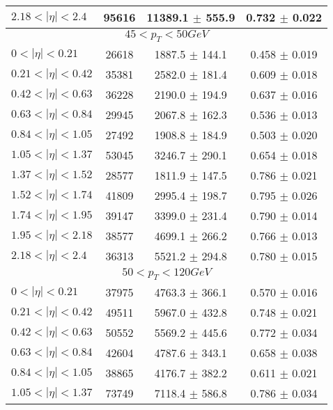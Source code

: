 \begin{tabular}{lccc}
$2.18 < |\eta| <2.4$           & 95616      & 11389.1    $\pm$ 555.9 & 0.732      $\pm$ 0.022 \\
\hline
\multicolumn{4}{c}{$45 < p_{T} < 50 GeV$} \\
\hline
$0 < |\eta| <0.21$             & 26618      & 1887.5     $\pm$ 144.1 & 0.458      $\pm$ 0.019 \\
$0.21 < |\eta| <0.42$          & 35381      & 2582.0     $\pm$ 181.4 & 0.609      $\pm$ 0.018 \\
$0.42 < |\eta| <0.63$          & 36228      & 2190.0     $\pm$ 194.9 & 0.637      $\pm$ 0.016 \\
$0.63 < |\eta| <0.84$          & 29945      & 2067.8     $\pm$ 162.3 & 0.536      $\pm$ 0.013 \\
$0.84 < |\eta| <1.05$          & 27492      & 1908.8     $\pm$ 184.9 & 0.503      $\pm$ 0.020 \\
$1.05 < |\eta| <1.37$          & 53045      & 3246.7     $\pm$ 290.1 & 0.654      $\pm$ 0.018 \\
$1.37 < |\eta| <1.52$          & 28577      & 1811.9     $\pm$ 147.5 & 0.786      $\pm$ 0.021 \\
$1.52 < |\eta| <1.74$          & 41809      & 2995.4     $\pm$ 198.7 & 0.795      $\pm$ 0.026 \\
$1.74 < |\eta| <1.95$          & 39147      & 3399.0     $\pm$ 231.4 & 0.790      $\pm$ 0.014 \\
$1.95 < |\eta| <2.18$          & 38577      & 4699.1     $\pm$ 266.2 & 0.766      $\pm$ 0.013 \\
$2.18 < |\eta| <2.4$           & 36313      & 5521.2     $\pm$ 294.8 & 0.780      $\pm$ 0.015 \\
\hline
\multicolumn{4}{c}{$50 < p_{T} < 120 GeV$} \\
\hline
$0 < |\eta| <0.21$             & 37975      & 4763.3     $\pm$ 366.1 & 0.570      $\pm$ 0.016 \\
$0.21 < |\eta| <0.42$          & 49511      & 5967.0     $\pm$ 432.8 & 0.748      $\pm$ 0.021 \\
$0.42 < |\eta| <0.63$          & 50552      & 5569.2     $\pm$ 445.6 & 0.772      $\pm$ 0.034 \\
$0.63 < |\eta| <0.84$          & 42604      & 4787.6     $\pm$ 343.1 & 0.658      $\pm$ 0.038 \\
$0.84 < |\eta| <1.05$          & 38865      & 4176.7     $\pm$ 382.2 & 0.611      $\pm$ 0.021 \\
$1.05 < |\eta| <1.37$          & 73749      & 7118.4     $\pm$ 586.8 & 0.786      $\pm$ 0.034 \\

\end{tabular}
